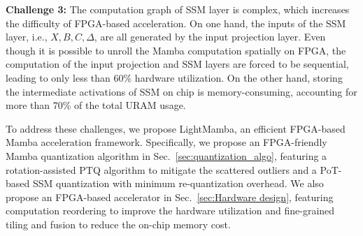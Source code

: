 \textbf{Challenge 3:}
The computation graph of SSM layer is complex, which increases the difficulty of FPGA-based
acceleration. On one hand, the inputs of the SSM layer, i.e., $X, B, C, \Delta$, are all
generated by the input projection layer. 
Even though it is possible to unroll the Mamba computation
spatially on FPGA, the computation of the input projection and SSM layers are forced to be sequential,
leading to only less than 60\% hardware utilization. 
On the other hand, storing the intermediate activations of SSM on chip is memory-consuming, accounting for more than 70\% of the total URAM usage.



To address these challenges, 
we propose LightMamba, 
an efficient FPGA-based Mamba acceleration framework.
Specifically, we propose an FPGA-friendly Mamba quantization algorithm in Sec.~\ref{sec:quantization_algo},
featuring a rotation-assisted PTQ algorithm to mitigate the scattered outliers
and a PoT-based SSM quantization with minimum re-quantization overhead.
We also propose an FPGA-based accelerator in Sec.~\ref{sec:Hardware design},
featuring computation reordering to improve the  hardware utilization
and fine-grained tiling and fusion to reduce the on-chip memory cost.


